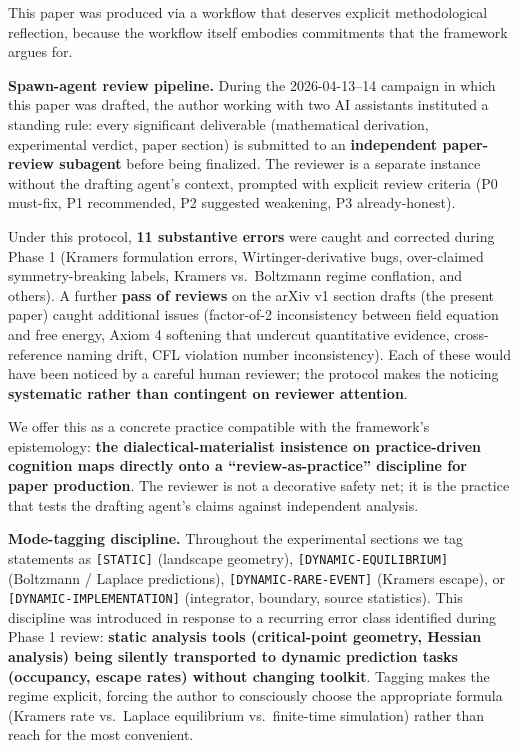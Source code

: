 \documentclass[
]{article}
\begin{document}
This paper was produced via a workflow that deserves explicit
methodological reflection, because the workflow itself embodies
commitments that the framework argues for.

\textbf{Spawn-agent review pipeline.} During the 2026-04-13--14 campaign
in which this paper was drafted, the author working with two AI
assistants instituted a standing rule: every significant deliverable
(mathematical derivation, experimental verdict, paper section) is
submitted to an \textbf{independent paper-review subagent} before being
finalized. The reviewer is a separate instance without the drafting
agent's context, prompted with explicit review criteria (P0 must-fix, P1
recommended, P2 suggested weakening, P3 already-honest).

Under this protocol, \textbf{11 substantive errors} were caught and
corrected during Phase 1 (Kramers formulation errors,
Wirtinger-derivative bugs, over-claimed symmetry-breaking labels,
Kramers vs.~Boltzmann regime conflation, and others). A further
\textbf{pass of reviews} on the arXiv v1 section drafts (the present
paper) caught additional issues (factor-of-2 inconsistency between field
equation and free energy, Axiom 4 softening that undercut quantitative
evidence, cross-reference naming drift, CFL violation number
inconsistency). Each of these would have been noticed by a careful human
reviewer; the protocol makes the noticing \textbf{systematic rather than
contingent on reviewer attention}.

We offer this as a concrete practice compatible with the framework's
epistemology: \textbf{the dialectical-materialist insistence on
practice-driven cognition maps directly onto a ``review-as-practice''
discipline for paper production}. The reviewer is not a decorative
safety net; it is the practice that tests the drafting agent's claims
against independent analysis.

\textbf{Mode-tagging discipline.} Throughout the experimental sections
we tag statements as \texttt{{[}STATIC{]}} (landscape geometry),
\texttt{{[}DYNAMIC-EQUILIBRIUM{]}} (Boltzmann / Laplace predictions),
\texttt{{[}DYNAMIC-RARE-EVENT{]}} (Kramers escape), or
\texttt{{[}DYNAMIC-IMPLEMENTATION{]}} (integrator, boundary, source
statistics). This discipline was introduced in response to a recurring
error class identified during Phase 1 review: \textbf{static analysis
tools (critical-point geometry, Hessian analysis) being silently
transported to dynamic prediction tasks (occupancy, escape rates)
without changing toolkit}. Tagging makes the regime explicit, forcing
the author to consciously choose the appropriate formula (Kramers rate
vs.~Laplace equilibrium vs.~finite-time simulation) rather than reach
for the most convenient.
\end{document}
